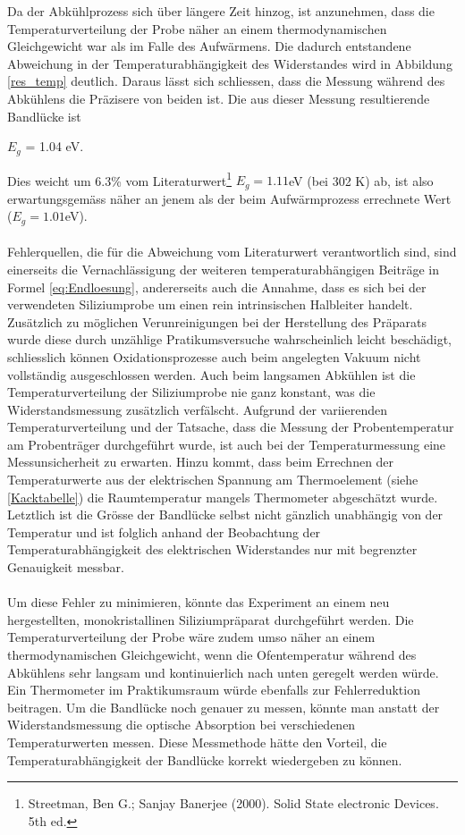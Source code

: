 \documentclass[a4paper,parskip,11pt, DIV12]{scrreprt}
\begin{document}
Da der Abkühlprozess sich über längere Zeit hinzog, ist anzunehmen, dass die Temperaturverteilung der Probe näher an einem thermodynamischen Gleichgewicht war als im Falle des Aufwärmens. Die dadurch entstandene Abweichung in der Temperaturabhängigkeit des Widerstandes wird in Abbildung
\ref{res_temp} deutlich. Daraus lässt sich schliessen, dass die Messung während des Abkühlens die Präzisere von beiden ist. Die aus dieser Messung resultierende Bandlücke ist \begin{center}
$E_g$ = 1.04 eV.
\end{center} Dies weicht um 6.3\% vom Literaturwert\footnote{Streetman, Ben G.; Sanjay Banerjee (2000). Solid State electronic Devices. 5th ed.} $E_g = 1.11$eV (bei 302 K) ab, ist also erwartungsgemäss näher an jenem als der beim Aufwärmprozess errechnete Wert ($E_g = 1.01$eV). \\
\\
Fehlerquellen, die für die Abweichung vom Literaturwert verantwortlich sind, sind einerseits die Vernachlässigung der weiteren temperaturabhängigen Beiträge in Formel \ref{eq:Endloesung}, andererseits auch die Annahme, dass es sich bei der verwendeten Siliziumprobe um einen rein intrinsischen Halbleiter handelt. Zusätzlich zu möglichen Verunreinigungen bei der Herstellung des Präparats wurde diese durch unzählige Pratikumsversuche wahrscheinlich leicht beschädigt, schliesslich können Oxidationsprozesse auch beim angelegten Vakuum nicht vollständig ausgeschlossen werden. Auch beim langsamen Abkühlen ist die Temperaturverteilung der Siliziumprobe nie ganz konstant, was die Widerstandsmessung zusätzlich verfälscht. Aufgrund der variierenden Temperaturverteilung und der Tatsache, dass die Messung der Probentemperatur am Probenträger durchgeführt wurde, ist auch bei der Temperaturmessung eine Messunsicherheit zu erwarten. Hinzu kommt, dass beim Errechnen der Temperaturwerte aus der elektrischen Spannung am Thermoelement (siehe \ref{Kacktabelle}) die Raumtemperatur mangels Thermometer abgeschätzt wurde. Letztlich ist die Grösse der Bandlücke selbst nicht gänzlich unabhängig von der Temperatur und ist folglich anhand der Beobachtung der Temperaturabhängigkeit des elektrischen Widerstandes nur mit begrenzter Genauigkeit messbar. \\
\\
Um diese Fehler zu minimieren, könnte das Experiment an einem neu hergestellten, monokristallinen Siliziumpräparat durchgeführt werden. Die Temperaturverteilung der Probe wäre zudem umso näher an einem thermodynamischen Gleichgewicht, wenn die Ofentemperatur während des Abkühlens sehr langsam und kontinuierlich nach unten geregelt werden würde. Ein Thermometer im Praktikumsraum würde ebenfalls zur Fehlerreduktion beitragen. Um die Bandlücke noch genauer zu messen, könnte man anstatt der Widerstandsmessung die optische Absorption bei verschiedenen Temperaturwerten messen. Diese Messmethode hätte den Vorteil, die Temperaturabhängigkeit der Bandlücke korrekt wiedergeben zu können.
\end{document}
